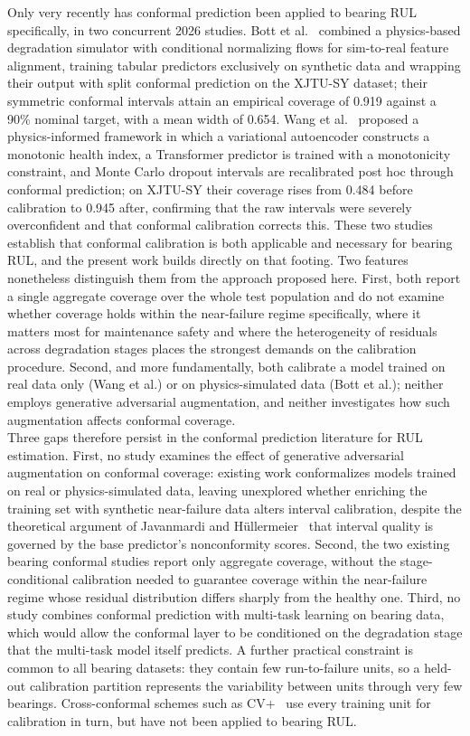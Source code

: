 \documentclass[review]{elsarticle}
\begin{document}
Only very recently has conformal prediction been applied to bearing
RUL specifically, in two concurrent 2026 studies.
Bott et al.~\cite{11373138} combined a physics-based degradation
simulator with conditional normalizing flows for sim-to-real feature
alignment, training tabular predictors exclusively on synthetic data
and wrapping their output with split conformal prediction on the
XJTU-SY dataset; their symmetric conformal intervals attain an
empirical coverage of 0.919 against a 90\% nominal target, with a mean
width of 0.654.
Wang et al.~\cite{wang_uncertainty-aware_2026} proposed a
physics-informed framework in which a variational autoencoder
constructs a monotonic health index, a Transformer predictor is
trained with a monotonicity constraint, and Monte Carlo dropout
intervals are recalibrated post hoc through conformal prediction;
on XJTU-SY their coverage rises from 0.484 before calibration to 0.945
after, confirming that the raw intervals were severely overconfident
and that conformal calibration corrects this. These two studies
establish that conformal calibration is both applicable and necessary
for bearing RUL, and the present work builds directly on that footing.
Two features nonetheless distinguish them from the approach proposed
here. First, both report a single aggregate coverage over the whole
test population and do not examine whether coverage holds within the
near-failure regime specifically, where it matters most for maintenance
safety and where the heterogeneity of residuals across degradation
stages places the strongest demands on the calibration procedure. Second, and more
fundamentally, both calibrate a model trained on real data only (Wang
et al.) or on physics-simulated data (Bott et al.); neither employs
generative adversarial augmentation, and neither investigates how such
augmentation affects conformal coverage.\\

Three gaps therefore persist in the conformal prediction literature for
RUL estimation. First, no study examines the effect of generative
adversarial augmentation on conformal coverage: existing work
conformalizes models trained on real or physics-simulated data, leaving
unexplored whether enriching the training set with synthetic
near-failure data alters interval calibration, despite the theoretical
argument of Javanmardi and
H{\"u}llermeier~\cite{javanmardi_conformal_2023} that interval quality
is governed by the base predictor's nonconformity scores. Second, the
two existing bearing conformal studies report only aggregate coverage,
without the stage-conditional calibration needed to guarantee coverage
within the near-failure regime whose residual distribution differs
sharply from the healthy one. Third, no study combines conformal
prediction with multi-task learning on bearing data, which would allow
the conformal layer to be conditioned on the degradation stage that
the multi-task model itself predicts. A further practical constraint
is common to all bearing datasets: they contain few run-to-failure
units, so a held-out calibration partition represents the variability
between units through very few bearings. Cross-conformal schemes such
as CV+~\cite{barber2021jackknife} use every training unit for
calibration in turn, but have not been applied to bearing RUL.
\end{document}
